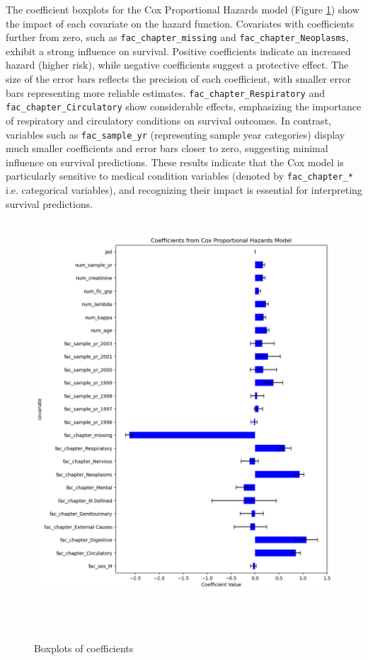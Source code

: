 \noindent The coefficient boxplots for the Cox Proportional Hazards model (Figure \ref{fig:cov}) show the impact of each covariate on the hazard function. Covariates with coefficients further from zero, such as \texttt{fac\_chapter\_missing} and \texttt{fac\_chapter\_Neoplasms}, exhibit a strong influence on survival. Positive coefficients indicate an increased hazard (higher risk), while negative coefficients suggest a protective effect. The size of the error bars reflects the precision of each coefficient, with smaller error bars representing more reliable estimates. \texttt{fac\_chapter\_Respiratory} and \texttt{fac\_chapter\_Circulatory} show considerable effects, emphasizing the importance of respiratory and circulatory conditions on survival outcomes. In contrast, variables such as \texttt{fac\_sample\_yr} (representing sample year categories) display much smaller coefficients and error bars closer to zero, suggesting minimal influence on survival predictions. These results indicate that the Cox model is particularly sensitive to medical condition variables (denoted by \texttt{fac\_chapter\_*} i.e. categorical variables), and recognizing their impact is essential for interpreting survival predictions.

\begin{figure}[h]
    \centering
    \includegraphics[scale=0.6]{Figures/SURV/cox_cov.png}
    \caption{Boxplots of coefficients}
    \label{fig:cov}
\end{figure}

